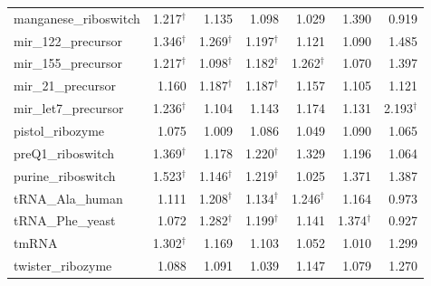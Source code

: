 \begin{longtable}{@{}lrrrrrr@{}}
manganese\_riboswitch & 1.217$^\dagger$ & 1.135 & 1.098 & 1.029 & 1.390 & 0.919 \\
mir\_122\_precursor & 1.346$^\dagger$ & 1.269$^\dagger$ & 1.197$^\dagger$ & 1.121 & 1.090 & 1.485 \\
mir\_155\_precursor & 1.217$^\dagger$ & 1.098$^\dagger$ & 1.182$^\dagger$ & 1.262$^\dagger$ & 1.070 & 1.397 \\
mir\_21\_precursor & 1.160 & 1.187$^\dagger$ & 1.187$^\dagger$ & 1.157 & 1.105 & 1.121 \\
mir\_let7\_precursor & 1.236$^\dagger$ & 1.104 & 1.143 & 1.174 & 1.131 & 2.193$^\dagger$ \\
pistol\_ribozyme & 1.075 & 1.009 & 1.086 & 1.049 & 1.090 & 1.065 \\
preQ1\_riboswitch & 1.369$^\dagger$ & 1.178 & 1.220$^\dagger$ & 1.329 & 1.196 & 1.064 \\
purine\_riboswitch & 1.523$^\dagger$ & 1.146$^\dagger$ & 1.219$^\dagger$ & 1.025 & 1.371 & 1.387 \\
tRNA\_Ala\_human & 1.111 & 1.208$^\dagger$ & 1.134$^\dagger$ & 1.246$^\dagger$ & 1.164 & 0.973 \\
tRNA\_Phe\_yeast & 1.072 & 1.282$^\dagger$ & 1.199$^\dagger$ & 1.141 & 1.374$^\dagger$ & 0.927 \\
tmRNA & 1.302$^\dagger$ & 1.169 & 1.103 & 1.052 & 1.010 & 1.299 \\
twister\_ribozyme & 1.088 & 1.091 & 1.039 & 1.147 & 1.079 & 1.270 \\
\bottomrule
\end{longtable}
